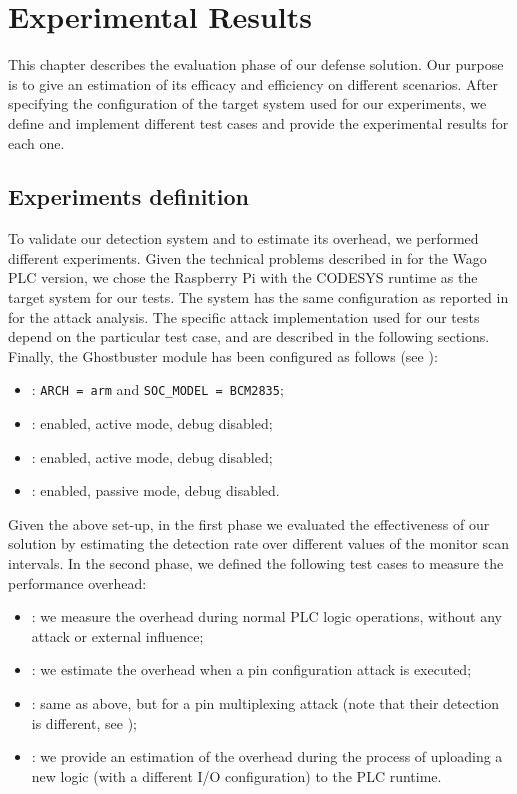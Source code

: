 \chapter{Experimental Results}
\label{chap:results}

This chapter describes the evaluation phase of our defense solution.
Our purpose is to give an estimation of its efficacy and efficiency on different scenarios.
After specifying the configuration of the target system used for our experiments, we define and implement different test cases
and provide the experimental results for each one.


\section{Experiments definition}

To validate our detection system and to estimate its overhead, we performed different experiments.
Given the technical problems described in  for the Wago PLC version, we chose the Raspberry Pi with the CODESYS runtime as the target system for our tests.
The system has the same configuration as reported in  for the attack analysis.
The specific attack implementation used for our tests depend on the particular test case, and are described in the following sections.
Finally, the Ghostbuster module has been configured as follows (see ):
\begin{itemize}
	\item {}: \verb|ARCH = arm| and \verb|SOC_MODEL = BCM2835|;
	\item {}: enabled, active mode, debug disabled;
	\item {}: enabled, active mode, debug disabled;
	\item {}: enabled, passive mode, debug disabled.
\end{itemize}

Given the above set-up, in the first phase we evaluated the effectiveness of our solution by estimating the detection rate over different values of the monitor scan intervals.
In the second phase, we defined the following test cases to measure the performance overhead:
\begin{itemize}
	\item {}: we measure the overhead during normal PLC logic operations, without any attack or external influence;
	\item {}: we estimate the overhead when a pin configuration attack is executed;
	\item {}: same as above, but for a pin multiplexing attack (note that their detection is different, see );
	\item {}: we provide an estimation of the overhead during the process of uploading a new logic (with a different I/O configuration) to the PLC runtime.
\end{itemize}

